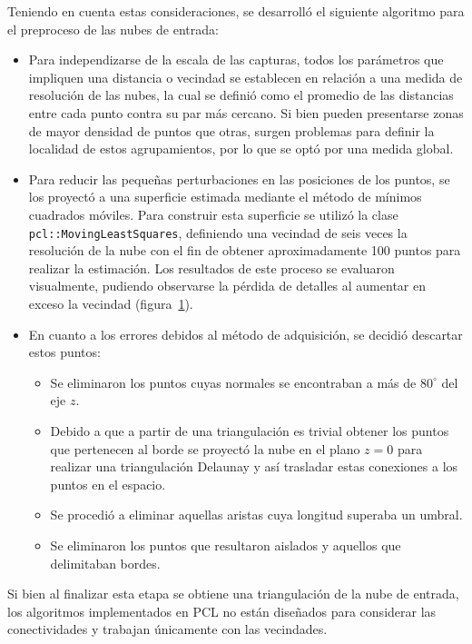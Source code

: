 Teniendo en cuenta estas consideraciones, se desarrolló el siguiente algoritmo
para el preproceso de las nubes de entrada:
\begin{itemize}
	\item Para independizarse de la escala de las capturas,
todos los parámetros que impliquen una distancia o vecindad
se establecen en relación a una medida de resolución de las nubes,
la cual se definió como el promedio de las distancias entre cada punto
contra su par más cercano.
Si bien pueden presentarse zonas de mayor densidad de puntos que otras,
surgen problemas para definir la localidad de estos agrupamientos,
por lo que se optó por una medida global.

\item Para reducir las pequeñas perturbaciones en las posiciones de los puntos,
se los proyectó a una superficie estimada mediante el método de mínimos cuadrados móviles.
Para construir esta superficie se utilizó la clase
\texttt{pcl::Moving\-Least\-Squares}, definiendo una vecindad de seis veces la
resolución de la nube con el fin de obtener aproximadamente 100 puntos para
realizar la estimación.
Los resultados de este proceso se evaluaron visualmente, pudiendo observarse la pérdida de detalles
al aumentar en exceso la vecindad (figura~\ref{fig:mls}).
\begin{figure}
	\caption{\label{fig:mls}}
\end{figure}

\item En cuanto a los errores debidos al método de adquisición, se decidió descartar estos puntos:
	\begin{itemize}
		\item Se eliminaron los puntos cuyas normales se encontraban a más de $80^{\circ}$ del eje $z$.
		\item Debido a que a partir de una triangulación es trivial obtener los puntos que pertenecen al borde
se proyectó la nube en el plano $z=0$ para realizar una triangulación Delaunay y así
trasladar estas conexiones a los puntos en el espacio.
		\item Se procedió a eliminar aquellas aristas cuya longitud superaba un umbral.
		\item Se eliminaron los puntos que resultaron aislados y aquellos que delimitaban bordes.
	\end{itemize}
\end{itemize}

Si bien al finalizar esta etapa se obtiene una triangulación de la nube de entrada,
los algoritmos implementados en PCL no están diseñados para considerar las conectividades y trabajan únicamente con las vecindades.
